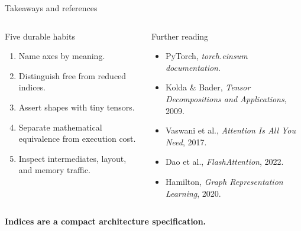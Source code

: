 \documentclass[aspectratio=169,10pt]{beamer}
\begin{document}
\begin{frame}{Takeaways and references}
\begin{columns}[T]
\begin{block}{Five durable habits}
\begin{enumerate}
 \item Name axes by meaning.
 \item Distinguish free from reduced indices.
 \item Assert shapes with tiny tensors.
 \item Separate mathematical equivalence from execution cost.
 \item Inspect intermediates, layout, and memory traffic.
\end{enumerate}
\end{block}
\begin{block}{Further reading}
\footnotesize
\begin{itemize}
 \item PyTorch, \emph{torch.einsum documentation}.
 \item Kolda \& Bader, \emph{Tensor Decompositions and Applications}, 2009.
 \item Vaswani et al., \emph{Attention Is All You Need}, 2017.
 \item Dao et al., \emph{FlashAttention}, 2022.
 \item Hamilton, \emph{Graph Representation Learning}, 2020.
\end{itemize}
\end{block}
\end{columns}
\vfill
\centering\Large\color{DLSblue}\textbf{Indices are a compact architecture specification.}
\end{frame}
\end{document}

